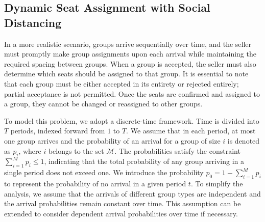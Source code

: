 
\subsection{Dynamic Seat Assignment with Social Distancing}\label{sec_dynamic}
In a more realistic scenario, groups arrive sequentially over time, and the seller must promptly make group assignments upon each arrival while maintaining the required spacing between groups. When a group is accepted, the seller must also determine which seats should be assigned to that group. It is essential to note that each group must be either accepted in its entirety or rejected entirely; partial acceptance is not permitted. Once the seats are confirmed and assigned to a group, they cannot be changed or reassigned to other groups.


To model this problem, we adopt a discrete-time framework. Time is divided into $T$ periods, indexed forward from $1$ to $T$. We assume that in each period, at most one group arrives and the probability of an arrival for a group of size $i$ is denoted as $p_i$, where $i$ belongs to the set $\mathcal{M}$. The probabilities satisfy the constraint $\sum_{i=1}^M p_i \leq 1$, indicating that the total probability of any group arriving in a single period does not exceed one. We introduce the probability $p_0 = 1 - \sum_{i=1}^{M} p_i$ to represent the probability of no arrival in a given period $t$. To simplify the analysis, we assume that the arrivals of different group types are independent and the arrival probabilities remain constant over time. This assumption can be extended to consider dependent arrival probabilities over time if necessary.

